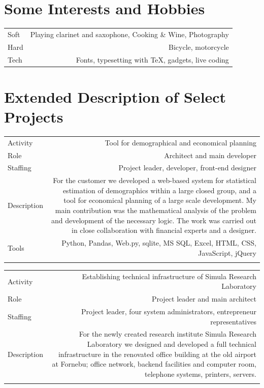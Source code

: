 \documentclass[english,a4paper,11pt]{article}
\begin{document}
\section*{Some Interests and Hobbies}
\begin{tabular}{LR}
Soft & Playing clarinet and saxophone, Cooking \& Wine, Photography \\
Hard & Bicycle, motorcycle \\
Tech & Fonts, typesetting with \TeX, gadgets, live coding 
\end{tabular}

\section*{Extended Description of Select Projects}

\begin{tabular}{@{}LR}
Activity & Tool for demographical and economical planning \\
Role & Architect and main developer \\
Staffing & Project leader, developer, front-end designer \\
Description & For the customer we developed a web-based system for statistical
estimation of demographics within a large closed group, and a tool for economical
planning of a large scale development. My main contribution was the mathematical
analysis of the problem and development of the necessary logic. The work was
carried out in close collaboration with financial experts and a designer.\\
Tools & Python, Pandas, Web.py, sqlite, MS SQL, Excel, HTML, CSS, JavaScript, jQuery \\
\addlinespace \bottomrule[.1pt] \addlinespace
\end{tabular}

\begin{tabular}{@{}LR}
Activity & Establishing technical infrastructure of Simula Research Laboratory \\
Role & Project leader and main architect \\
Staffing & Project leader, four system administrators, entrepreneur
representatives \\
Description & For the newly created research institute Simula Research
Laboratory we designed and developed a full technical infrastructure in the
renovated office building at the old airport at Fornebu; office network, backend
facilities and computer room, telephone systems, printers, servers. \\
\addlinespace \bottomrule[.1pt] \addlinespace
\end{tabular}
\end{document}
